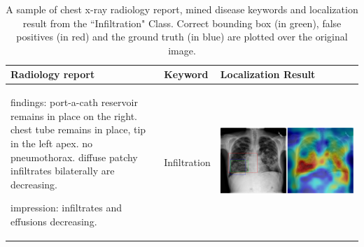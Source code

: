 \documentclass[10pt,twocolumn,letterpaper]{article}
\begin{document}
\begin{table}
	\begin{center}
		\begin{tabular}{p{15em}|p{6em}|p{23em}}
			\hline
			Radiology report & Keyword & Localization Result\\
			\hline\hline
			findings: port-a-cath reservoir remains in place on the right. chest tube remains in place, tip in the left apex. no pneumothorax. diffuse patchy infiltrates bilaterally are decreasing. 
			
			impression: infiltrates and effusions decreasing.
			& Infiltration 
			&\vspace{0cm}\includegraphics[width=1\linewidth]{00155987_01_c_4.png} \\
			\hline
		\end{tabular}
	\end{center}
	\caption{A sample of chest x-ray radiology report, mined disease keywords and localization result from the ``Infiltration" Class. Correct bounding box (in green), false positives (in red) and the ground truth (in blue) are plotted over the original image.}
	\label{tab:Loc_example_4}
\end{table}
\end{document}
